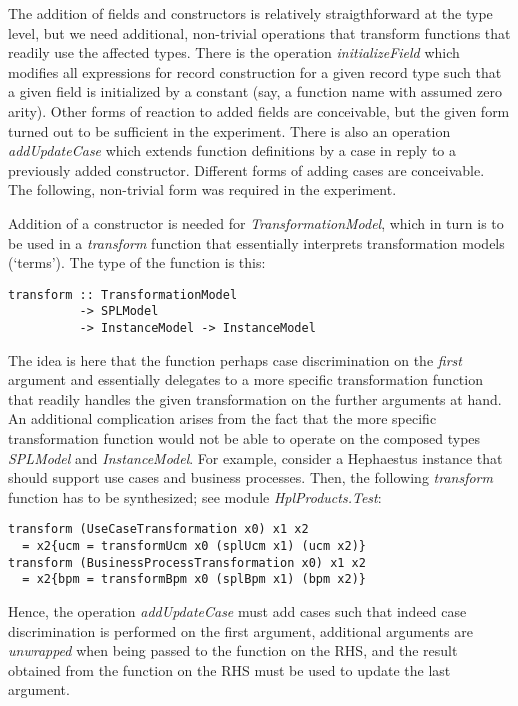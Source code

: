 \documentclass{article}
\begin{document}
The addition of fields and constructors is relatively straigthforward at the type level, but we need additional, non-trivial operations that transform functions that readily use the affected types. There is the operation \emph{initializeField} which modifies all expressions for record construction for a given record type such that a given field is initialized by a constant (say, a function name with assumed zero arity). Other forms of reaction to added fields are conceivable, but the given form turned out to be sufficient in the experiment. There is also an operation \emph{addUpdateCase} which extends function definitions by a case in reply to a previously added constructor. Different forms of adding cases are conceivable. The following, non-trivial form was required in the experiment. 

Addition of a constructor is needed for \emph{TransformationModel}, which in turn is to be used in a \emph{transform} function that essentially interprets transformation models (`terms'). The type of the function is this:

\begin{verbatim}
transform :: TransformationModel
          -> SPLModel 
          -> InstanceModel -> InstanceModel
\end{verbatim}

The idea is here that the function perhaps case discrimination on the \emph{first} argument and essentially delegates to a more specific transformation function that readily handles the given transformation on the further arguments at hand. An additional complication arises from the fact that the more specific transformation function would not be able to operate on the composed types \emph{SPLModel} and \emph{InstanceModel}. For example, consider a
Hephaestus instance that should support use cases and business processes. Then, the following \emph{transform}
function has to be synthesized; see module \emph{HplProducts.Test}:

\begin{verbatim}
transform (UseCaseTransformation x0) x1 x2
  = x2{ucm = transformUcm x0 (splUcm x1) (ucm x2)}
transform (BusinessProcessTransformation x0) x1 x2
  = x2{bpm = transformBpm x0 (splBpm x1) (bpm x2)}
\end{verbatim}

Hence, the  operation \emph{addUpdateCase} must add cases such that indeed case discrimination is performed on the first argument, additional arguments are \emph{unwrapped} when being passed to the function on the RHS, and the result obtained from the function on the RHS must be used to update the last argument.
\end{document}
